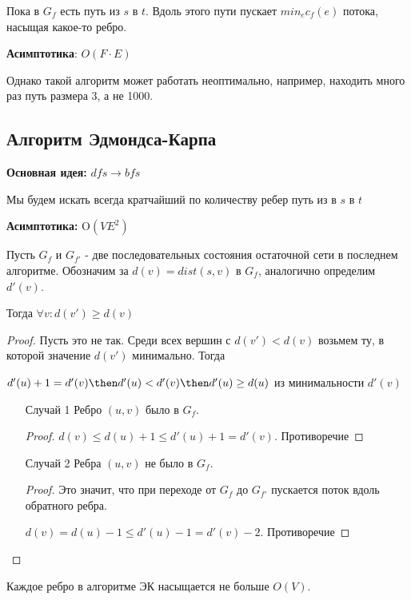 Пока в $G_f$ есть путь из $s$ в $t$. Вдоль этого пути пускает $min_e c_f(e)$ потока, насыщая какое-то ребро.

\textbf{Асимптотика}: $O(F \cdot E)$

Однако такой алгоритм может работать неоптимально, например, находить много раз путь размера 3, а не 1000. 

\subsection{Алгоритм Эдмондса-Карпа}

\textbf{Основная идея:} $dfs \to bfs$

Мы будем искать всегда кратчайший по количеству ребер путь из в $s$ в $t$

\textbf{Асимптотика:} O$(VE^2)$

\begin{lemma}
  Пусть $G_f$ и $G_{f'}$ - две последовательных состояния остаточной сети в последнем алгоритме. Обозначим за $d(v) = dist(s, v)$ в $G_f$, аналогично определим $d'(v)$.

  Тогда $\forall v: d(v') \ge d(v)$
\end{lemma}

\begin{proof}
  Пусть это не так. Среди всех вершин с $d(v') < d(v)$ возьмем ту, в которой значение $d(v')$ минимально. Тогда

  $d'(u) + 1 = d'(v) \then d'(u) < d'(v) \then d'(u) \ge d(u)$ из минимальности $d'(v)$

  \begin{enumerate}
    \item[Случай 1] Ребро $(u, v)$ было в $G_f$. 
    \begin{proof}
      $d(v) \le d(u) + 1 \le d'(u) + 1 = d'(v)$. Противоречие
    \end{proof}

    \item[Случай 2] Ребра $(u, v)$ не было в $G_f$. 
    \begin{proof}
      Это значит, что при переходе от $G_f$ до $G_{f'}$ пускается поток вдоль обратного ребра.

      $d(v) = d(u) - 1 \le d'(u) - 1 = d'(v) - 2$. Противоречие
    \end{proof}
  \end{enumerate}
\end{proof}

\begin{lemma}
  Каждое ребро в алгоритме ЭК насыщается не больше $O(V)$. 
\end{lemma}

